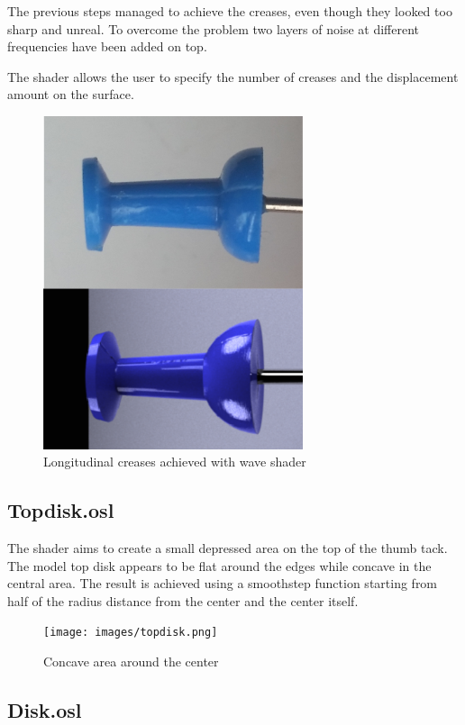 \documentclass[tog]{acmsiggraph}
\begin{document}
The previous steps managed to achieve the creases, even though they looked too sharp and unreal. To overcome the problem two layers of noise at different frequencies have been added on top.

The shader allows the user to specify the number of creases and the displacement amount on the surface.

\begin{figure}[ht]
  \centering
  \includegraphics[width=3.0in]{images/wave.png}
  \caption{Longitudinal creases achieved with wave shader}
  \label{fig:wave}
\end{figure}

\subsection{Topdisk.osl}

The shader aims to create a small depressed area on the top of the thumb tack. The model top disk appears to be flat around the edges while concave in the central area. The result is achieved using a smoothstep function starting from half of the radius distance from the center and the center itself.

\begin{figure}[h!]
  \centering
  \texttt{[image: images/topdisk.png]}
  \caption{Concave area around the center}
  \label{fig:topdisk}
\end{figure}

\newpage
\subsection{Disk.osl}
\end{document}
